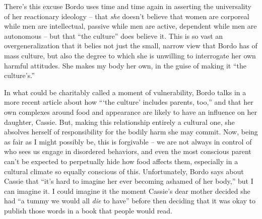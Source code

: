 \documentclass[11pt]{article}
\begin{document}
    There's this excuse Bordo uses time and time again in asserting the universality of her reactionary ideology -- that \textit{she} doesn't believe that women are corporeal while men are intellectual, passive while men are active, dependent while men are autonomous -- but that ``the culture'' does believe it. This is so vast an overgeneralization that it belies not just the small, narrow view that Bordo has of mass culture, but also the degree to which she is unwilling to interrogate her own harmful attitudes. She makes my body her own, in the guise of making it ``the culture's.'' 
    
    In what could be charitably called a moment of vulnerability, Bordo talks in a more recent article about how ```the culture' includes parents, too,'' and that her own complexes around food and appearance are likely to have an influence on her daughter, Cassie. But, making this relationship entirely a cultural one, she absolves herself of responsibility for the bodily harm she may commit. Now, being as fair as I might possibly be, this is forgivable -- we are not always in control of who sees us engage in disordered behaviors, and even the most conscious parent can't be expected to perpetually hide how food affects them, especially in a cultural climate so equally conscious of this. Unfortunately, Bordo says about Cassie that ``it's hard to imagine her ever becoming ashamed of her body,'' but I can imagine it. I could imagine it the moment Cassie's dear mother decided she had ``a tummy we would all \textit{die} to have'' before then deciding that it was okay to publish those words in a book that people would read.~\autocite[273-274 (original emphasis)]{Bordo09}
\end{document}
